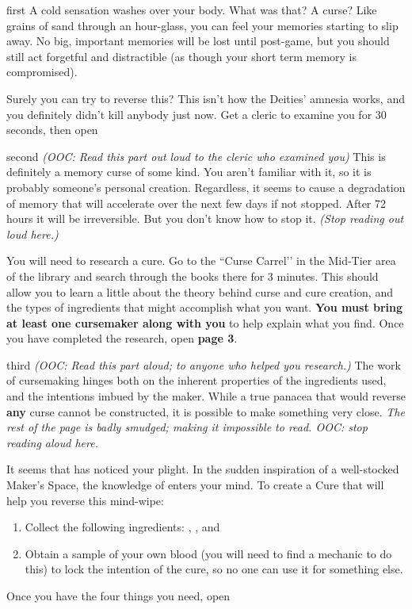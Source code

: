\documentclass[notebook]{GL2020} %
\begin{document}
\startnotebook{\nReverseMindWipe{}}

\begin{page}{first}
A cold sensation washes over your body. What was that? A curse? Like grains of sand through an hour-glass, you can feel your memories starting to slip away. No big, important memories will be lost until post-game, but you should still act forgetful and distractible (as though your short term memory is compromised).

Surely you can try to reverse this? This isn’t how the Deities’ amnesia works, and you definitely didn’t kill anybody just now. Get a cleric to examine you for 30 seconds, then open 
\end{page}

\begin{page}{second}
\emph{(OOC: Read this part out loud to the cleric who examined you)} This is definitely a memory curse of some kind. You aren’t familiar with it, so it is probably someone’s personal creation. Regardless, it seems to cause a degradation of memory that will accelerate over the next few days if not stopped. After 72 hours it will be irreversible. But you don’t know how to stop it. \emph{(Stop reading out loud here.)}

You will need to research a cure. Go to the ``Curse Carrel’’ in the Mid-Tier area of the library and search through the books there for 3 minutes. This should allow you to learn a little about the theory behind curse and cure creation, and the types of ingredients that might accomplish what you want. \textbf{You must bring at least one cursemaker along with you} to help explain what you find. Once you have completed the research, open \textbf{page 3}. 
\end{page}

\begin{page}{third}
\emph{(OOC: Read this part aloud; to anyone who helped you research.)} The work of cursemaking hinges both on the inherent properties of the ingredients used, and the intentions imbued by the maker. While a true panacea that would reverse \textbf{any} curse cannot be constructed, it is possible to make something very close. \emph{The rest of the page is badly smudged; making it impossible to read. OOC: stop reading aloud here.}

It seems that \cTechGod{} has noticed your plight. In the sudden inspiration of a well-stocked Maker’s Space, the knowledge of \cTechGod{} enters your mind. To create a Cure that will help you reverse this mind-wipe:
\begin{enumerate}
	\item Collect the following ingredients: \iFish{}, \iCharcoal{}, and \iSight{}
	\item  Obtain a sample of your own blood (you will need to find a mechanic to do this) to lock the intention of the cure, so no one can use it for something else.
\end{enumerate}

Once you have the four things you need, open 
\end{page}
\end{document}
